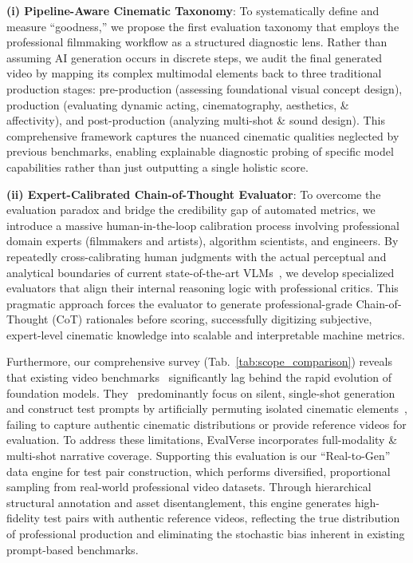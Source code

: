 \documentclass{article}
\begin{document}
\textbf{(i) Pipeline-Aware Cinematic Taxonomy}: To systematically define and measure ``goodness,'' we propose the first evaluation taxonomy that employs the professional filmmaking workflow as a structured diagnostic lens. Rather than assuming AI generation occurs in discrete steps, we audit the final generated video by mapping its complex multimodal elements back to three traditional production stages: pre-production (assessing foundational visual concept design), production (evaluating dynamic acting, cinematography, aesthetics, \& affectivity), and post-production (analyzing multi-shot \& sound design). This comprehensive framework captures the nuanced cinematic qualities neglected by previous benchmarks, enabling explainable diagnostic probing of specific model capabilities rather than just outputting a single holistic score.
    
\textbf{(ii) Expert-Calibrated Chain-of-Thought Evaluator}: To overcome the evaluation paradox and bridge the credibility gap of automated metrics, we introduce a massive human-in-the-loop calibration process involving professional domain experts (filmmakers and artists), algorithm scientists, and engineers. By repeatedly cross-calibrating human judgments with the actual perceptual and analytical boundaries of current state-of-the-art VLMs~\cite{gemini,Qwen3-VL}, we develop specialized evaluators that align their internal reasoning logic with professional critics. This pragmatic approach forces the evaluator to generate professional-grade Chain-of-Thought (CoT) rationales before scoring, successfully digitizing subjective, expert-level cinematic knowledge into scalable and interpretable machine metrics.

Furthermore, our comprehensive survey (Tab.~\ref{tab:scope_comparison}) reveals that existing video benchmarks~\cite{evalcrafter,vbench,vbench++,vbench2} significantly lag behind the rapid evolution of foundation models. They~\cite{cinetechbench,univbench,msvbench,muss} predominantly focus on silent, single-shot generation and construct test prompts by artificially permuting isolated cinematic elements~\cite{stable_cinemetrics}, failing to capture authentic cinematic distributions or provide reference videos for evaluation. To address these limitations, EvalVerse incorporates full-modality \& multi-shot narrative coverage. Supporting this evaluation is our ``Real-to-Gen'' data engine for test pair construction, which performs diversified, proportional sampling from real-world professional video datasets. Through hierarchical structural annotation and asset disentanglement, this engine generates high-fidelity test pairs with authentic reference videos, reflecting the true distribution of professional production and eliminating the stochastic bias inherent in existing prompt-based benchmarks.
\end{document}
